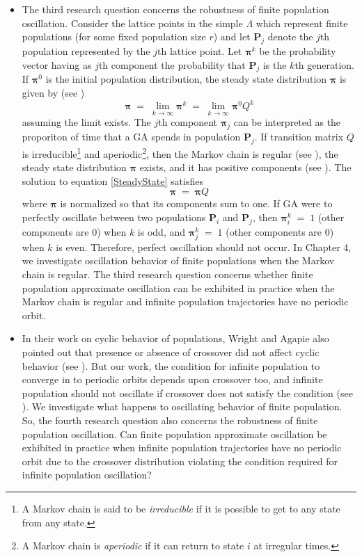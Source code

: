 \begin{itemize}
\item{
The third research question concerns the robustness of finite population oscillation.
Consider the lattice points in the simple $\Lambda$ which represent finite populations 
(for some fixed population size $r$) 
and let $\bm{P}_j$ denote the $j$th population represented by the $j$th lattice point. 
Let $\bm{\pi}^k$ be the probability vector having as $j$th component 
the probability that $\bm{P}_j$ is the $k$th generation. 
If $\bm{\pi}^0$ is the initial population distribution, 
the steady state distribution $\bm{\pi}$ is given by (see \cite{Haggstrom2002})
\begin{equation}
\label{SteadyState}
\bm{\pi} \;=\; \lim_{k \to \infty} \bm{\pi}^k \;=\; \lim_{k \to \infty} \bm{\pi}^0 Q^k
\end{equation}
assuming the limit exists. The $j$th component $\bm{\pi}_j$ can be interpreted 
as the proporiton of time that a GA spends in population $\bm{P}_j$.
If transition matrix $Q$ is irreducible\footnote{A Markov chain is said to be 
{\em irreducible} if it is possible to get to any state from any state.} 
and aperiodic\footnote{A Markov chain is {\em aperiodic} if it can return to 
state $i$ at irregular times.}, then the Markov chain is 
regular (see \cite{Iosifescu1980}), the steady state distribution $\bm{\pi}$ exists, and it has positive components 
(see \cite{Minc1988}). 
The solution to equation \ref{SteadyState} satisfies
\begin{equation}
\label{SteadyStateSolution}
\bm{\pi} \; = \; \bm{\pi} Q
\end{equation}
where $\bm{\pi}$ is normalized so that its components sum to one.
If GA were to perfectly oscillate between two populations $\bm{P}_i$ and $\bm{P}_j$, then 
$\bm{\pi}^k_i \;=\; 1$ (other components are $0$) when $k$ is odd, 
and $\bm{\pi}^k_j \;=\; 1$ (other components are $0$) when $k$ is even. 
Therefore, perfect oscillation should not occur. In Chapter 4, we investigate oscillation behavior of 
finite populations when the Markov chain is regular. The third research question concerns whether 
finite population approximate oscillation can be exhibited in practice when the Markov chain is regular and 
infinite population trajectories have no periodic orbit.
}

\item{
In their work on cyclic behavior of populations, Wright and Agapie also pointed out that presence or 
absence of crossover did not affect cyclic behavior (see \cite{Wright2001}). 
But our work, the condition for infinite population to converge in to periodic orbits depends upon crossover too, 
and infinite population should not oscillate if crossover does not satisfy the condition (see \cite{Vose1999}). 
We investigate what happens to oscillating behavior of finite population.
So, the fourth research question also concerns the robustness of finite population oscillation. 
Can finite population approximate oscillation be exhibited in practice when infinite population 
trajectories have no periodic orbit due to the crossover distribution violating the condition 
required for infinite population oscillation? 

}

\end{itemize}

